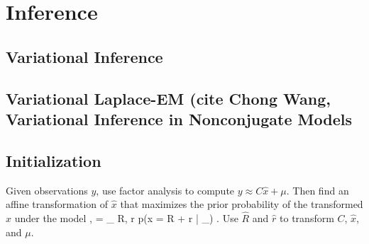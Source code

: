\documentclass{article}
\DeclareMathOperator*{\argmax}{arg\,max}
\begin{document}
%

\section{Inference}

\subsection{Variational Inference}

\subsection{Variational Laplace-EM (cite Chong Wang, Variational Inference in Nonconjugate Models}

\subsection{Initialization}
Given observations $y$, use factor analysis to compute $y \approx C \hat{x} + \mu$. Then find an affine transformation of $\hat{x}$ that maximizes the prior probability of the transformed $\hat{x}$ under the model 
\be
{},  = \argmax_{ R, r } \log p(x = R  + r | \theta_) .
\ee
Use $\hat{R}$ and $\hat{r}$ to transform $C$, $\hat{x}$, and $\mu$.
\end{document}
